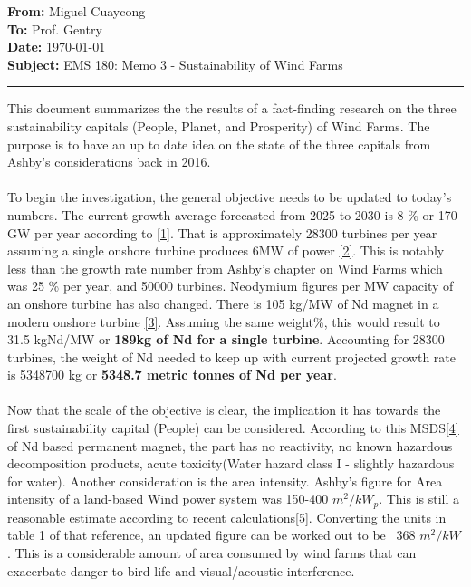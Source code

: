 \documentclass[11pt]{article}
\newcommand{\memoheader}[4]{
  \noindent
  \textbf{From:} #2\\ 
  \textbf{To:} #1\\
  \textbf{Date:} #3\\
  \textbf{Subject:} #4\\[1ex]\hrule\vspace{1.5ex}
}
\begin{document}
\memoheader{Prof. Gentry}
            {Miguel Cuaycong}
            {\today}
            {EMS 180: Memo 3 - Sustainability of Wind Farms}
\noindent This document summarizes the the results of a fact-finding research on the three sustainability capitals (People, Planet, and Prosperity) of Wind Farms. The purpose is to have an up to date idea on the state of the three capitals from Ashby's considerations back in 2016.
\\~\\
To begin the investigation, the general objective needs to be updated to today's numbers. The current growth average forecasted from 2025 to 2030 is 8 \% or 170 GW per year according to \href{https://www.gwec.net/gwec-news/wind-industry-installs-record-capacity-in-2024-despite-policy-instability}{[1]}. 
That is approximately 28300 turbines per year assuming a single onshore turbine produces 6MW of power \href{https://www.gwec.net/gwec-news/wind-turbine-suppliers-deliver-new-record-volume-despite-difficult-year-full-of-diverse-challenges}{[2]}. 
This is notably less than the growth rate number from Ashby's chapter on Wind Farms which was 25 \% per year, and 50000 turbines. 
Neodymium figures per MW capacity of an onshore turbine has also changed. There is 105 kg/MW of Nd magnet in a modern onshore turbine \href{https://cdn.ceps.eu/wp-content/uploads/2023/07/CEPS-In-depth-analysis-2022-07_Supply-chain-for-recycled-rare-earth-permanent-magnets-1.pdf}{[3]}.
 Assuming the same weight\%, this would result to 31.5 kgNd/MW or \textbf{189kg of Nd for a single turbine}. Accounting for 28300 turbines, the weight of Nd needed to keep up with current projected growth rate is 5348700 kg or \textbf{5348.7 metric tonnes of Nd per year}.
\\~\\
Now that the scale of the objective is clear, the implication it has towards the first sustainability capital (People) can be considered.
According to this MSDS\href{https://www.vacuumschmelze.com/03_Documents/Quality/Material%20Safety%20Data%20Sheets/SDS%2056%20%20(GB).pdf}{[4]}
of Nd based permanent magnet, the part has no reactivity, no known hazardous decomposition products, acute toxicity(Water hazard class I - slightly hazardous for water). 
Another consideration is the area intensity. Ashby's figure for Area intensity of a land-based Wind power system was 150-400 $m^2/kW_p$. This is still a reasonable estimate according to recent calculations\href{https://journals.plos.org/plosone/article?id=10.1371/journal.pone.0270155#pone-0270155-t001}{[5]}.
Converting the units in table 1 of that reference, an updated figure can be worked out to be ~368 $m^2/kW$. This is a considerable amount of area consumed by wind farms that can exacerbate danger to bird life and visual/acoustic interference.
\end{document}
